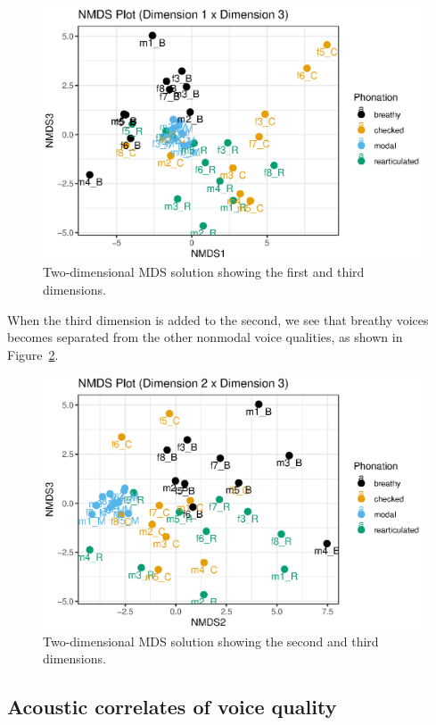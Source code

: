 \begin{figure}[!h]
        \centering
        \includegraphics[width = \linewidth]{images/nmds13.eps}
        \caption{Two-dimensional MDS solution showing the first and third dimensions.}
        \label{fig:nmds13}
\end{figure}
    
When the third dimension is added to the second, we see that breathy voices becomes separated from the other nonmodal voice qualities, as shown in Figure~\ref{fig:nmds23}. 

\begin{figure}[!h]
    \centering
    \includegraphics[width = \linewidth]{images/nmds23.eps}
    \caption{Two-dimensional MDS solution showing the second and third dimensions.}
    \label{fig:nmds23}
\end{figure}


\subsection{Acoustic correlates of voice quality} \label{sec:acousticlandscape:correlates}

